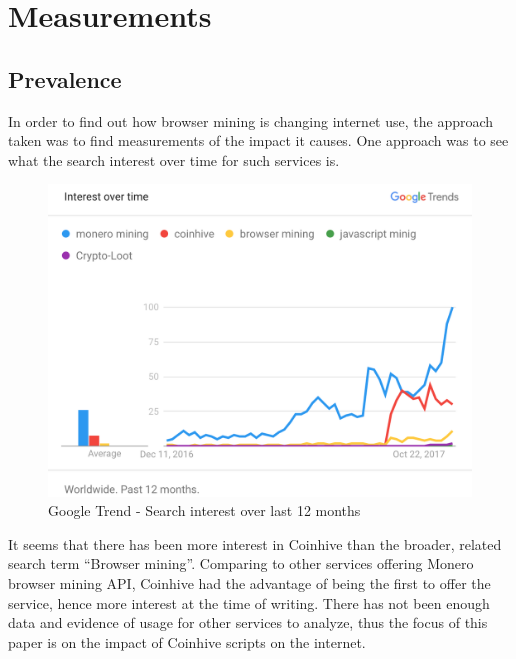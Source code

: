 %
%
%
%
%
%

\section{Measurements}

\subsection{Prevalence}

In order to find out how browser mining is changing internet use, the approach taken was to find measurements of the impact it causes. One approach was to see what the search interest over time for such services is. 

\begin{figure}[t]
\centering
\includegraphics[width=\linewidth]{figures/usage_over_time2.png}
\caption{Google Trend - Search interest over last 12 months}
\end{figure}

It seems that there has been more interest in Coinhive than the broader, related search term ``Browser mining''. Comparing to other services offering Monero browser mining API, Coinhive had the advantage of being the first to offer the service, hence more interest at the time of writing. There has not been enough data and evidence of usage for other services to analyze, thus the focus of this paper is on the impact of Coinhive scripts on the internet. 

